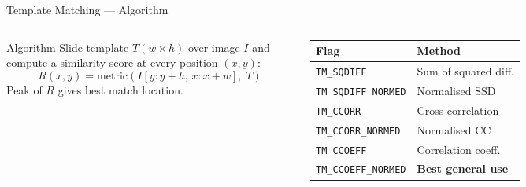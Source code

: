 \documentclass[aspectratio=169]{beamer}
\begin{document}
\begin{frame}{Template Matching — Algorithm}
  \begin{columns}
    \begin{block}{Algorithm}
      Slide template $T(w\times h)$ over image $I$ and compute a similarity
      score at every position $(x,y)$:
      \[
        R(x,y) = \text{metric}(I[y:y{+}h,\, x:x{+}w],\; T)
      \]
      Peak of $R$ gives best match location.
    \end{block}
    \vspace{4pt}
    \begin{tabular}{ll}
      \toprule
      \textbf{Flag} & \textbf{Method}\\
      \midrule
      \texttt{TM\_SQDIFF}       & Sum of squared diff.\\
      \texttt{TM\_SQDIFF\_NORMED} & Normalised SSD\\
      \texttt{TM\_CCORR}        & Cross-correlation\\
      \texttt{TM\_CCORR\_NORMED} & Normalised CC\\
      \texttt{TM\_CCOEFF}       & Correlation coeff.\\
      \texttt{TM\_CCOEFF\_NORMED} & \textbf{Best general use}\\
      \bottomrule
    \end{tabular}
  \end{columns}
\end{frame}
\end{document}

